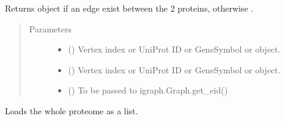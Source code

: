 \documentclass[letterpaper,10pt,english]{sphinxmanual}
\begin{document}
\begin{fulllineitems}
\begin{fulllineitems}
\begin{description}
\end{description}

\end{fulllineitems}


\begin{fulllineitems}
\label{\detokenize{main:pypath.main.PyPath.protein_edge}}
Returns  object if an edge exist between
the 2 proteins, otherwise .
\begin{quote}\begin{description}
\item[{Parameters}] \leavevmode\begin{itemize}
\item {} 
 (\sphinxstyleliteralemphasis{\sphinxupquote{,}}) \textendash{} Vertex index or UniProt ID or GeneSymbol or 
object.

\item {} 
 (\sphinxstyleliteralemphasis{\sphinxupquote{,}}) \textendash{} Vertex index or UniProt ID or GeneSymbol or 
object.

\item {} 
 () \textendash{} To be passed to igraph.Graph.get\_eid()

\end{itemize}

\end{description}\end{quote}

\end{fulllineitems}


\begin{fulllineitems}
\label{\detokenize{main:pypath.main.PyPath.proteome_list}}
Loads the whole proteome as a list.


\end{fulllineitems}
\end{fulllineitems}
\end{document}
